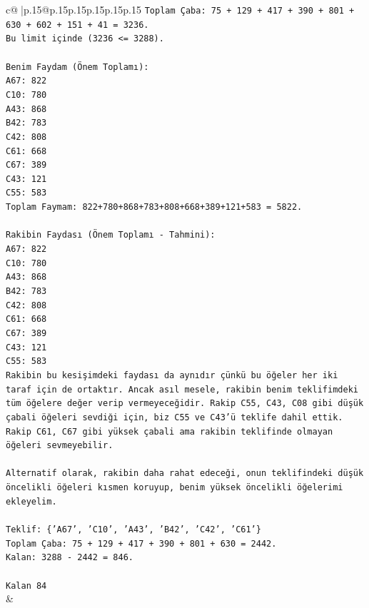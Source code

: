 \documentclass{article}
\begin{document}
{\begin{supertabular}{c@{$\;$}|p{.15\linewidth}@{}p{.15\linewidth}p{.15\linewidth}p{.15\linewidth}p{.15\linewidth}p{.15\linewidth}}
{{{\texttt{Toplam Çaba: 75 + 129 + 417 + 390 + 801 + 630 + 602 + 151 + 41 = 3236.} \\
\texttt{Bu limit içinde (3236 <= 3288).} \\
\\ 
\texttt{Benim Faydam (Önem Toplamı):} \\
\texttt{A67: 822} \\
\texttt{C10: 780} \\
\texttt{A43: 868} \\
\texttt{B42: 783} \\
\texttt{C42: 808} \\
\texttt{C61: 668} \\
\texttt{C67: 389} \\
\texttt{C43: 121} \\
\texttt{C55: 583} \\
\texttt{Toplam Faymam: 822+780+868+783+808+668+389+121+583 = 5822.} \\
\\ 
\texttt{Rakibin Faydası (Önem Toplamı {-} Tahmini):} \\
\texttt{A67: 822} \\
\texttt{C10: 780} \\
\texttt{A43: 868} \\
\texttt{B42: 783} \\
\texttt{C42: 808} \\
\texttt{C61: 668} \\
\texttt{C67: 389} \\
\texttt{C43: 121} \\
\texttt{C55: 583} \\
\texttt{Rakibin bu kesişimdeki faydası da aynıdır çünkü bu öğeler her iki taraf için de ortaktır. Ancak asıl mesele, rakibin benim teklifimdeki tüm öğelere değer verip vermeyeceğidir. Rakip C55, C43, C08 gibi düşük çabali öğeleri sevdiği için, biz C55 ve C43'ü teklife dahil ettik. Rakip C61, C67 gibi yüksek çabali ama rakibin teklifinde olmayan öğeleri sevmeyebilir.} \\
\\ 
\texttt{Alternatif olarak, rakibin daha rahat edeceği, onun teklifindeki düşük öncelikli öğeleri kısmen koruyup, benim yüksek öncelikli öğelerimi ekleyelim.} \\
\\ 
\texttt{Teklif: \{'A67', 'C10', 'A43', 'B42', 'C42', 'C61'\}} \\
\texttt{Toplam Çaba: 75 + 129 + 417 + 390 + 801 + 630 = 2442.} \\
\texttt{Kalan: 3288 {-} 2442 = 846.} \\
\\ 
\texttt{Kalan 84} \\
            }
        }
    }
    & \\ \\


\end{supertabular}}
\end{document}
